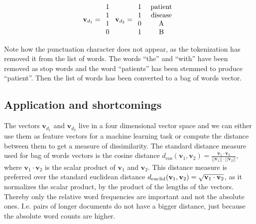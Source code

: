 \[
\textbf{v}_{d_1}=\begin{array}{c}
1\\
1\\
1\\
0
\end{array}\ \textbf{v}_{d_2}=\begin{array}{c}
1\\
1\\
0\\
1
\end{array}\ \begin{array}{c}
\rm{patient}\\
\rm{disease}\\
\rm{A}\\
\rm{B}\\
\end{array}
\]

Note how the punctuation character does not appear, as the tokenization has removed it from the list of words. The words ``the'' and ``with'' have been removed as stop words and the word ``patients'' has been stemmed to produce ``patient''. Then the list of words has been converted to a bag of words vector.

\subsection*{Application and shortcomings}
The vectors $\textbf{v}_{d_1}$ and $\textbf{v}_{d_2}$ live in a four dimensional vector space and we can either use them as feature vectors for a machine learning task or compute the distance between them to get a measure of dissimilarity. The standard distance measure used for bag of words vectors is the cosine distance $d_{\cos}(\textbf{v}_1, \textbf{v}_2)=\frac{\textbf{v}_1\cdot \textbf{v}_2}{||\textbf{v}_1||\cdot ||\textbf{v}_2||}$, where $\textbf{v}_1\cdot \textbf{v}_2$ is the scalar product of $\textbf{v}_1$ and $\textbf{v}_2$. This distance measure is preferred over the standard euclidean distance $d_{\rm{euclid}}(\textbf{v}_1, \textbf{v}_2)=\sqrt{\textbf{v}_1\cdot \textbf{v}_2}$, as it normalizes the scalar product, by the product of the lengths of the vectors. Thereby only the relative word frequencies are important and not the absolute ones. I.e. pairs of longer documents do not have a bigger distance, just because the absolute word counts are higher. 

